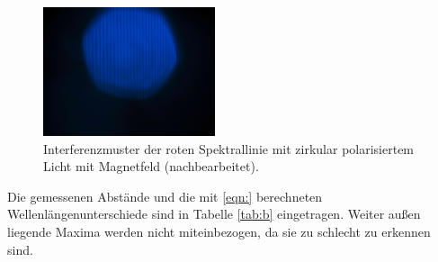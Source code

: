 \FloatBarrier
\begin{figure}
  \centering
  \includegraphics[width=0.45\textwidth]{IMG_0123k.jpg}
  \caption{Interferenzmuster der roten Spektrallinie mit zirkular polarisiertem Licht mit Magnetfeld (nachbearbeitet).}
  \label{fig:b3}
\end{figure}
\FloatBarrier

Die gemessenen Abstände und die mit \ref{eqn:} %
berechneten Wellenlängenunterschiede sind in Tabelle \ref{tab:b} eingetragen. Weiter außen liegende Maxima werden nicht miteinbezogen,
da sie zu schlecht zu erkennen sind.
\FloatBarrier
